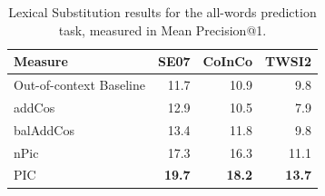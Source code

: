 \documentclass[12pt]{article}
\begin{document}
\begin{table}
\begin{center}
\begin{tabular}{|l|r|r|r|}
  \hline
  {\bf Measure} & {\bf SE07} & {\bf CoInCo} & {\bf TWSI2}\\
  \hline\hline
  Out-of-context Baseline                  &     11.7   &    10.9   &      9.8       \\
  addCos                                   &     12.9   &    10.5   &      7.9       \\
  balAddCos                                &     13.4   &    11.8   &      9.8       \\
  \hline
  nPic                                     &     17.3   &    16.3   &     11.1       \\
  PIC                                      & {\bf19.7}  &{\bf18.2}  & {\bf13.7}      \\
  \hline
\end{tabular}
\end{center}
\caption{Lexical Substitution results for the all-words prediction task, measured
in Mean Precision@1.}
\label{tab:precision}
\end{table}
\end{document}
